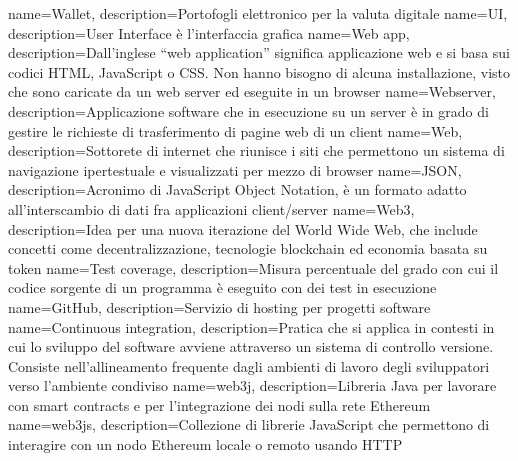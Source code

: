  { name={Wallet}, description={Portofogli elettronico per la valuta digitale} }
 { name={UI}, description={User Interface è l'interfaccia grafica} }
 { name={Web app}, description={Dall'inglese “web application” significa applicazione web e si basa sui codici HTML, JavaScript o CSS. Non hanno bisogno di alcuna installazione, visto che sono caricate da un web server ed eseguite in un browser} }
 { name={Webserver}, description={Applicazione software che in esecuzione su un server è in grado di gestire le richieste di trasferimento di pagine web di un client} }
 { name={Web}, description={Sottorete di internet che riunisce i siti che permettono un sistema di navigazione ipertestuale e visualizzati per mezzo di browser} }
 { name={JSON}, description={Acronimo di JavaScript Object Notation, è un formato adatto all'interscambio di dati fra applicazioni client/server} }
 { name={Web3}, description={Idea per una nuova iterazione del World Wide Web, che include concetti come decentralizzazione, tecnologie blockchain ed economia basata su token} }
 { name={Test coverage}, description={Misura percentuale del grado con cui il codice sorgente di un programma è eseguito con dei test in esecuzione} }
 { name={GitHub}, description={Servizio di hosting per progetti software} }
 { name={Continuous integration}, description={Pratica che si applica in contesti in cui lo sviluppo del software avviene attraverso un sistema di controllo versione. Consiste nell'allineamento frequente dagli ambienti di lavoro degli sviluppatori verso l'ambiente condiviso} }
 { name={web3j}, description={Libreria Java per lavorare con smart contracts e per l'integrazione dei nodi sulla rete Ethereum} }
 { name={web3js}, description={Collezione di librerie JavaScript che permettono di interagire con un nodo Ethereum locale o remoto usando HTTP} }

